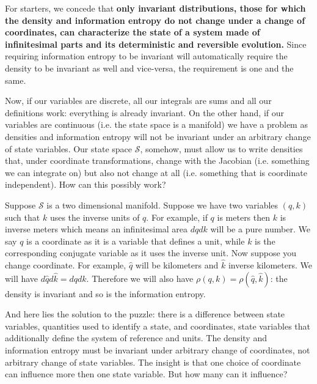 \documentclass[11pt]{article}
\begin{document}
For starters, we concede that \textbf{only invariant distributions, those for which the density and information entropy do not change under a change of coordinates, can characterize the state of a system made of infinitesimal parts and its deterministic and reversible evolution.} Since requiring information entropy to be invariant will automatically require the density to be invariant as well and vice-versa, the requirement is one and the same.

Now, if our variables are discrete, all our integrals are sums and all our definitions work: everything is already invariant. On the other hand, if our variables are continuous (i.e. the state space is a manifold) we have a problem as densities and information entropy will not be invariant under an arbitrary change of state variables. Our state space $\mathcal{S}$, somehow, must allow us to write densities that, under coordinate transformations, change with the Jacobian (i.e. something we can integrate on) but also not change at all (i.e. something that is coordinate independent). How can this possibly work?

Suppose $\mathcal{S}$ is a two dimensional manifold. Suppose we have two variables $(q,k)$ such that $k$ uses the inverse units of $q$. For example, if $q$ is meters then $k$ is inverse meters which means an infinitesimal area $dq dk$ will be a pure number. We say $q$ is a coordinate as it is a variable that defines a unit, while $k$ is the corresponding conjugate variable as it uses the inverse unit. Now suppose you change coordinate. For example, $\hat{q}$ will be kilometers and $\hat{k}$ inverse kilometers. We will have $d\hat{q} d\hat{k} = dq dk$. Therefore we will also have $\rho(q,k) = \rho(\hat{q}, \hat{k})$: the density is invariant and so is the information entropy.

And here lies the solution to the puzzle: there is a difference between state variables, quantities used to identify a state, and coordinates, state variables that additionally define the system of reference and units. The density and information entropy must be invariant under arbitrary change of coordinates, not arbitrary change of state variables. The insight is that one choice of coordinate can influence more then one state variable. But how many can it influence?
\end{document}
